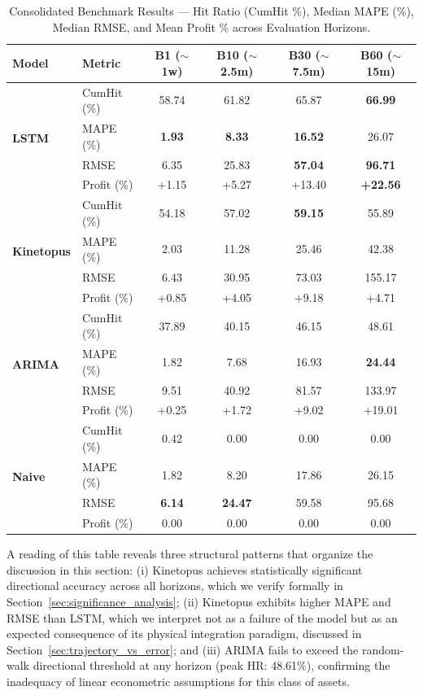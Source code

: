 \documentclass[11pt,a4paper]{article}
\begin{document}
\begin{table}[H]
\centering
\small
\caption{Consolidated Benchmark Results --- Hit Ratio (CumHit \%), Median MAPE (\%), Median RMSE, and Mean Profit \% across Evaluation Horizons.}
\label{tab:consolidated_results}
\begin{tabular}{llcccc}
\toprule
\textbf{Model} & \textbf{Metric} & \textbf{B1 ($\sim$1w)} & \textbf{B10 ($\sim$2.5m)} & \textbf{B30 ($\sim$7.5m)} & \textbf{B60 ($\sim$15m)} \\
\midrule
\multirow{4}{*}{\textbf{LSTM}} 
 & CumHit (\%) & 58.74 & 61.82 & 65.87 & \textbf{66.99} \\
 & MAPE (\%) & \textbf{1.93} & \textbf{8.33} & \textbf{16.52} & 26.07 \\
 & RMSE & 6.35 & 25.83 & \textbf{57.04} & \textbf{96.71} \\
 & Profit (\%) & +1.15 & +5.27 & +13.40 & \textbf{+22.56} \\
\midrule
\multirow{4}{*}{\textbf{Kinetopus}} 
 & CumHit (\%) & 54.18 & 57.02 & \textbf{59.15} & 55.89 \\
 & MAPE (\%) & 2.03 & 11.28 & 25.46 & 42.38 \\
 & RMSE & 6.43 & 30.95 & 73.03 & 155.17 \\
 & Profit (\%) & +0.85 & +4.05 & +9.18 & +4.71 \\
\midrule
\multirow{4}{*}{\textbf{ARIMA}} 
 & CumHit (\%) & 37.89 & 40.15 & 46.15 & 48.61 \\
 & MAPE (\%) & 1.82 & 7.68 & 16.93 & \textbf{24.44} \\
 & RMSE & 9.51 & 40.92 & 81.57 & 133.97 \\
 & Profit (\%) & +0.25 & +1.72 & +9.02 & +19.01 \\
\midrule
\multirow{4}{*}{\textbf{Naive}} 
 & CumHit (\%) & 0.42 & 0.00 & 0.00 & 0.00 \\
 & MAPE (\%) & 1.82 & 8.20 & 17.86 & 26.15 \\
 & RMSE & \textbf{6.14} & \textbf{24.47} & 59.58 & 95.68 \\
 & Profit (\%) & 0.00 & 0.00 & 0.00 & 0.00 \\
\bottomrule
\end{tabular}
\end{table}

A reading of this table reveals three structural patterns that organize the discussion in this section: (i) Kinetopus achieves statistically significant directional accuracy across all horizons, which we verify formally in Section~\ref{sec:significance_analysis}; (ii) Kinetopus exhibits higher MAPE and RMSE than LSTM, which we interpret not as a failure of the model but as an expected consequence of its physical integration paradigm, discussed in Section~\ref{sec:trajectory_vs_error}; and (iii) ARIMA fails to exceed the random-walk directional threshold at any horizon (peak HR: 48.61\%), confirming the inadequacy of linear econometric assumptions for this class of assets.
\end{document}
